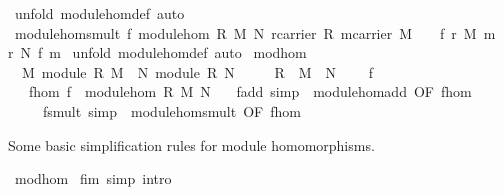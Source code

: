 \begin{isabellebody}
%
\isadelimproof
%
\endisadelimproof
%
\isatagproof
{}\isamarkupfalse%
\ {\isacharparenleft}unfold\ module{\isacharunderscore}hom{\isacharunderscore}def{\isacharcomma}\ auto{\isacharparenright}%
\endisatagproof
{\isafoldproof}%
%
\isadelimproof
\isanewline
%
\endisadelimproof
\isanewline
{}\isamarkupfalse%
\ module{\isacharunderscore}hom{\isacharunderscore}smult{\isacharcolon}\ {\isachardoublequoteopen}{\isasymlbrakk}f{\isasymin}\ module{\isacharunderscore}hom\ R\ M\ N{\isacharsemicolon}\ r{\isasymin}carrier\ R{\isacharsemicolon}\ m{\isasymin}carrier\ M\ {\isasymrbrakk}\ \ {\isasymLongrightarrow}\ f\ {\isacharparenleft}r\ {\isasymodot}\isactrlbsub M\isactrlesub \ m{\isacharparenright}\ {\isacharequal}\ r\ {\isasymodot}\isactrlbsub N\isactrlesub \ {\isacharparenleft}f\ m{\isacharparenright}{\isachardoublequoteclose}\isanewline
%
\isadelimproof
%
\endisadelimproof
%
\isatagproof
{}\isamarkupfalse%
\ {\isacharparenleft}unfold\ module{\isacharunderscore}hom{\isacharunderscore}def{\isacharcomma}\ auto{\isacharparenright}%
\endisatagproof
{\isafoldproof}%
%
\isadelimproof
\isanewline
%
\endisadelimproof
\isanewline
{}\isamarkupfalse%
\ mod{\isacharunderscore}hom\ {\isacharequal}\ \isanewline
\ \ M{\isacharcolon}\ module\ R\ M\ {\isacharplus}\ N{\isacharcolon}\ module\ R\ N\isanewline
\ \ \ \ \ R\ \ M\ \ N\ {\isacharplus}\isanewline
\ \ \ f\isanewline
\ \ \ f{\isacharunderscore}hom{\isacharcolon}\ {\isachardoublequoteopen}f\ {\isasymin}\ module{\isacharunderscore}hom\ R\ M\ N{\isachardoublequoteclose}\isanewline
\ \ \ f{\isacharunderscore}add\ {\isacharbrackleft}simp{\isacharbrackright}\ {\isacharequal}\ module{\isacharunderscore}hom{\isacharunderscore}add\ {\isacharbrackleft}OF\ f{\isacharunderscore}hom{\isacharbrackright}\isanewline
\ \ \ \ \ f{\isacharunderscore}smult\ {\isacharbrackleft}simp{\isacharbrackright}\ {\isacharequal}\ module{\isacharunderscore}hom{\isacharunderscore}smult\ {\isacharbrackleft}OF\ f{\isacharunderscore}hom{\isacharbrackright}%
\begin{isamarkuptext}%
Some basic simplification rules for module homomorphisms.%
\end{isamarkuptext}%
\isamarkuptrue%
\isamarkupfalse%
\ mod{\isacharunderscore}hom\isanewline
{}\isanewline
\isanewline
{}\isamarkupfalse%
\ f{\isacharunderscore}im\ {\isacharbrackleft}simp{\isacharcomma}\ intro{\isacharbrackright}{\isacharcolon}\ \isanewline

\end{isabellebody}
